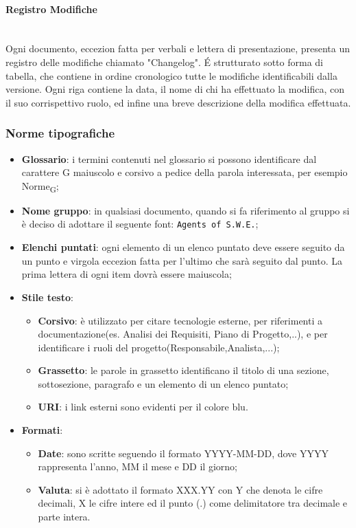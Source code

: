 \paragraph{Registro Modifiche} \-\\
Ogni documento, eccezion fatta per verbali e lettera di presentazione, presenta un registro delle modifiche chiamato "Changelog". \'E strutturato sotto forma di tabella, che contiene in ordine cronologico tutte le modifiche identificabili dalla versione.  Ogni riga contiene la data, il nome di chi ha effettuato la modifica, con il suo corrispettivo ruolo, ed infine una breve descrizione della modifica effettuata.


\subsubsection{Norme tipografiche}
\begin{itemize}
	\item \textbf{Glossario}: i termini contenuti nel glossario si possono identificare dal carattere G maiuscolo e corsivo a pedice della parola interessata, per esempio Norme\textsubscript{G};	 		
	\item \textbf{Nome gruppo}: in qualsiasi documento, quando si fa riferimento al gruppo si è deciso di adottare il seguente font: \texttt{Agents of S.W.E.};
	\item \textbf{Elenchi puntati}: ogni elemento di un elenco puntato deve essere seguito da un punto e virgola eccezion fatta per l'ultimo che sarà seguito dal punto. La prima lettera di ogni item dovrà essere maiuscola;
	\item \textbf{Stile testo}:
	\begin{itemize}
		\item \textbf{Corsivo}: è utilizzato per citare tecnologie esterne, per riferimenti a documentazione(es. Analisi dei Requisiti, Piano di Progetto,..), e per identificare i ruoli del progetto(Responsabile,Analista,...);	
		\item \textbf{Grassetto}: le parole in grassetto identificano il titolo di una sezione, sottosezione, paragrafo e un elemento di un elenco puntato;
		\item \textbf{URI}:	i link esterni sono evidenti per il colore blu.
	\end{itemize}
	\item \textbf{Formati}:
	\begin{itemize}
		\item \textbf{Date}: sono scritte seguendo il formato YYYY-MM-DD, dove YYYY rappresenta l'anno, MM il mese e DD il giorno;
		\item \textbf{Valuta}: si è adottato il formato XXX.YY con Y che denota le cifre decimali, X le cifre intere ed il punto (.) come delimitatore tra decimale e parte intera.
	\end{itemize}
\end{itemize}


